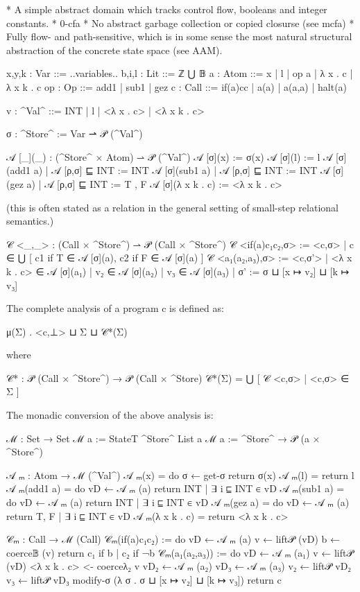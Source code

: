 \documentclass{article}
\begin{document}
* A simple abstract domain which tracks control flow, booleans and integer
  constants.
* 0-cfa
* No abstract garbage collection or copied closurse (see mcfa)
* Fully flow- and path-sensitive, which is in some sense the most natural
  structural abstraction of the concrete state space (see AAM).

x,y,k : Var  ::= ..variables..
b,i,l : Lit  ::= ℤ ⋃ 𝔹
a     : Atom ::= x | l | op a | λ x . c | λ x k . c
op    : Op   ::= add1 | sub1 | gez
c     : Call ::= if(a){c}{c} | a(a) | a(a,a) | halt(a)

v  : ^Val^ ::= INT | l | <λ x . c> | <λ x k . c>

σ  : ^Store^ := Var ⇀  𝒫 (^Val^)

𝒜 [_](_) : (^Store^ × Atom) ⇀  𝒫 (^Val^)
𝒜 [σ](x)                      := σ(x)
𝒜 [σ](l)                      := { l }
𝒜 [σ](add1 a) | 𝒜 [ρ,σ] ⊑ INT := { INT }
𝒜 [σ](sub1 a) | 𝒜 [ρ,σ] ⊑ INT := { INT }
𝒜 [σ](gez a)  | 𝒜 [ρ,σ] ⊑ INT := { T , F }
𝒜 [σ](λ x k . c)              := { <λ x k . c> }

(this is often stated as a relation in the general setting of small-step
relational semantics.)

𝒞 <_,_> : (Call × ^Store^) ⇀  𝒫 (Call × ^Store^)
𝒞 <if(a){c₁}{c₂},σ> := { <c,σ> |  c  ∈ ⋃ [ { c1 } if T ∈ 𝒜 [σ](a), { c2 } if F ∈ 𝒜 [σ](a) ] }
𝒞 <a₁(a₂,a₃),σ>     := { <c,σ'> 
                       | <λ x k . c>  ∈ 𝒜 [σ](a₁)
                       |          v₂  ∈ 𝒜 [σ](a₂)
                       |          v₃  ∈ 𝒜 [σ](a₃)
                       |          σ' := σ ⊔ [x ↦ v₂] ⊔ [k ↦ v₃]
                       }

The complete analysis of a program c is defined as:

μ(Σ) . {<c,⊥>} ⊔ Σ ⊔ 𝒞*(Σ)

where

𝒞* : 𝒫 (Call × ^Store^) → 𝒫 (Call × ^Store)
𝒞*(Σ) = ⋃ [ 𝒞 <c,σ> | <c,σ> ∈ Σ ]

The monadic conversion of the above analysis is:

ℳ  : Set → Set
ℳ  a := StateT ^Store^ List a
ℳ  a := ^Store^ → 𝒫 (a × ^Store^)

𝒜 ₘ : Atom → ℳ (^Val^)
𝒜 ₘ(x) = do
  σ ← get-σ
  return σ(x)
𝒜 ₘ(l) = return {l}
𝒜 ₘ(add1 a) = do
  vD ← 𝒜 ₘ (a)
  return {INT | ∃ i ⊑ INT ∈ vD}
𝒜 ₘ(sub1 a) = do
  vD ← 𝒜 ₘ (a)
  return {INT | ∃ i ⊑ INT ∈ vD}
𝒜 ₘ(gez a) = do
  vD ← 𝒜 ₘ (a)
  return {T, F | ∃ i ⊑ INT ∈ vD}
𝒜 ₘ(λ x k . c) = return <λ x k . c>

𝒞ₘ : Call → ℳ (Call)
𝒞ₘ(if(a){c₁}{c₂}) := do
  vD ← 𝒜 ₘ (a)
  v ← lift𝒫 (vD)
  b ← coerce𝔹 (v)
  return { c₁ if b | c₂ if ¬b }
𝒞ₘ(a₁(a₂,a₃)) := do
  vD ← 𝒜 ₘ (a₁)
  v ← lift𝒫 (vD)
  <λ x k . c> <- coerceλ₂ v
  vD₂ ← 𝒜 ₘ (a₂)
  vD₃ ← 𝒜 ₘ (a₃)
  v₂ ← lift𝒫 vD₂
  v₃ ← lift𝒫 vD₃
  modify-σ (λ σ . σ ⊔ [x ↦ v₂] ⊔ [k ↦ v₃])
  return c
\end{document}
